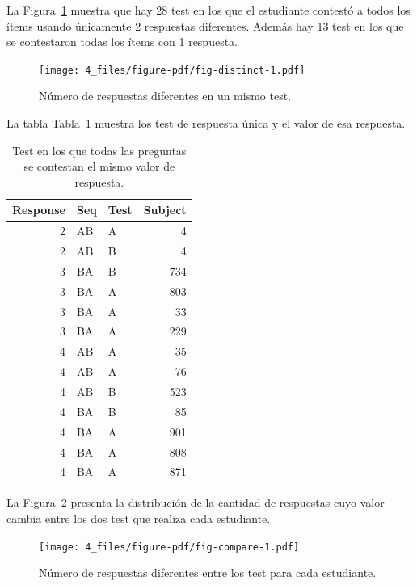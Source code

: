 \documentclass[
  12pt,
  a4paper,
  extrafontsizes,
  onecolumn,
  openright,
  table]{memoir}
\begin{document}
La Figura~\ref{fig-distinct} muestra que hay 28 test en los que el
estudiante contestó a todos los ítems usando únicamente 2 respuestas
diferentes. Además hay 13 test en los que se contestaron todas los ítems
con 1 respuesta.

\begin{figure}[h]

{\centering \texttt{[image: 4\_files/figure-pdf/fig-distinct-1.pdf]}

}

\caption{\label{fig-distinct}Número de respuestas diferentes en un mismo
test.}

\end{figure}

La tabla Tabla~\ref{tbl-distinct2} muestra los test de respuesta única y
el valor de esa respuesta.

\hypertarget{tbl-distinct2}{}
\begin{longtable}{rllr}
\caption{\label{tbl-distinct2}Test en los que todas las preguntas se contestan el mismo valor de
respuesta. }\tabularnewline

\toprule
Response & Seq & Test & Subject \\ 
\midrule
2 & AB & A & 4 \\ 
2 & AB & B & 4 \\ 
3 & BA & B & 734 \\ 
3 & BA & A & 803 \\ 
3 & BA & A & 33 \\ 
3 & BA & A & 229 \\ 
4 & AB & A & 35 \\ 
4 & AB & A & 76 \\ 
4 & AB & B & 523 \\ 
4 & BA & B & 85 \\ 
4 & BA & A & 901 \\ 
4 & BA & A & 808 \\ 
4 & BA & A & 871 \\ 
\bottomrule
\end{longtable}

La Figura~\ref{fig-compare} presenta la distribución de la cantidad de
respuestas cuyo valor cambia entre los dos test que realiza cada
estudiante.

\begin{figure}[h]

{\centering \texttt{[image: 4\_files/figure-pdf/fig-compare-1.pdf]}

}

\caption{\label{fig-compare}Número de respuestas diferentes entre los
test para cada estudiante.}

\end{figure}
\end{document}
